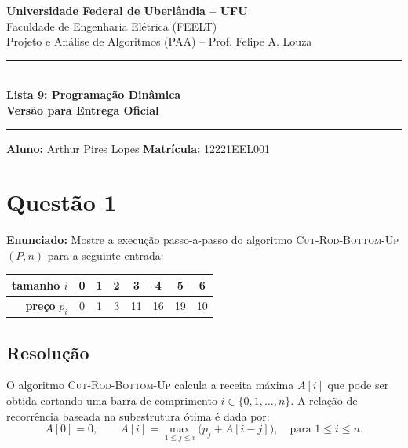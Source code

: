 \documentclass[11pt,a4paper]{article}
\begin{document}
\begin{center}
    {\Large \textbf{Universidade Federal de Uberlândia -- UFU}}\\[2pt]
    {\large Faculdade de Engenharia Elétrica (FEELT)}\\[2pt]
    {\large Projeto e Análise de Algoritmos (PAA) -- Prof. Felipe A. Louza}\\[4pt]
    \rule{\textwidth}{1pt}\\[5pt]
    {\LARGE \textbf{Lista 9: Programação Dinâmica}}\\[3pt]
    \textbf{Versão para Entrega Oficial}\\[2pt]
    \rule{\textwidth}{0.5pt}
\end{center}

\vspace{0.1cm}
\noindent \textbf{Aluno:} Arthur Pires Lopes \quad \textbf{Matrícula:} 12221EEL001

\vspace{0.3cm}

\section*{Questão 1}
\textbf{Enunciado:} Mostre a execução passo-a-passo do algoritmo \textsc{Cut-Rod-Bottom-Up}$(P, n)$ para a seguinte entrada:
\begin{center}
\begin{tabular}{r|ccccccc}
\toprule
\textbf{tamanho} $i$ & 0 & 1 & 2 & 3 & 4 & 5 & 6 \\
\midrule
\textbf{preço} $p_i$ & 0 & 1 & 3 & 11 & 16 & 19 & 10 \\
\bottomrule
\end{tabular}
\end{center}

\subsection*{Resolução}

O algoritmo \textsc{Cut-Rod-Bottom-Up} calcula a receita máxima $A[i]$ que pode ser obtida cortando uma barra de comprimento $i \in \{0, 1, \dots, n\}$. A relação de recorrência baseada na subestrutura ótima é dada por:
\begin{equation}
A[0] = 0, \qquad A[i] = \max_{1 \le j \le i} \Big( p_j + A[i - j] \Big), \quad \text{para } 1 \le i \le n.
\end{equation}
\end{document}
